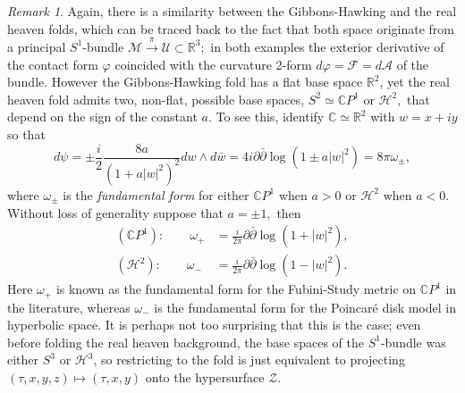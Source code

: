 \documentclass[a4paper,12pt, onecolumn, notitlepage]{article}
\theoremstyle{definition}
\theoremstyle{remark}
\newtheorem{rmk}[thm]{Remark}
\newcommand{\w}{\omega}
\newcommand{\vp}{\varphi}
\begin{document}
\begin{rmk}
	Again, there is a similarity between the Gibbons-Hawking and the real heaven folds, which can be traced back to the fact that both space originate from a principal $S^{1}$-bundle $\mathcal{M}\overset{\pi}{\rightarrow}\mathcal{U}\subset\mathbb{R}^{3};$ in both examples the exterior derivative of the contact form $\vp$ coincided with the curvature 2-form $d\vp=\mathcal{F}=d\mathcal{A}$ of the bundle. However the Gibbons-Hawking fold has a flat base space $\mathbb{R}^{2}$, yet the real heaven fold admits two, non-flat, possible base spaces, $S^{2}\simeq \mathbb{C}P^{1}$ or $\mathcal{H}^{2},$ that depend on the sign of the constant $a.$ To see this, identify $\mathbb{C}\simeq\mathbb{R}^{2}$ with $w=x+iy$ so that
	\begin{equation}
		d\psi=\pm\frac{i}{2}\frac{8a}{(1+a|w|^{2})^{2}}dw\wedge d\bar{w} = 4i\partial\bar{\partial}\log(1\pm a|w|^{2}) = 8\pi\w_{\pm},
	\end{equation}
	where $\w_{\pm}$ is the \emph{fundamental form} for either $\mathbb{C}P^{1}$ when $a>0$ or $\mathcal{H}^{2}$ when $a<0.$ Without loss of generality suppose that $a = \pm 1,$ then
	\begin{subequations}
		\begin{align}
		\label{fubini}
		(\mathbb{C}P^{1}):\qquad \w_{+} &= \frac{i}{2\pi}\partial\bar{\partial}\log(1+|w|^{2}),\\
		\label{poincare}
		(\mathcal{H}^{2}):\qquad \w_{-} &= \frac{i}{2\pi}\partial\bar{\partial}\log(1-|w|^{2}).
		\end{align} 
	\end{subequations}
	Here $\w_{+}$ is known as the fundamental form for the Fubini-Study metric on $\mathbb{C}P^{1}$ in the literature, whereas $\w_{-}$ is the fundamental form for the Poincar\'{e} disk model in hyperbolic space. It is perhaps not too surprising that this is the case; even before folding the real heaven background, the base spaces of the $S^{1}$-bundle was either $S^{3}$ or $\mathcal{H}^{3}$, so restricting to the fold is just equivalent to projecting $(\tau, x, y, z)\mapsto(\tau, x, y)$ onto the hypersurface $\mathcal{Z}.$
\end{rmk}
\end{document}

